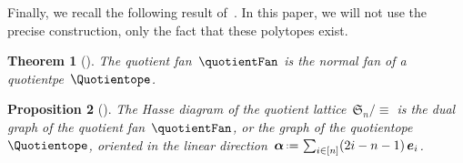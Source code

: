 \documentclass{amsart}
\newtheorem{theorem}{Theorem}[section]
\newtheorem{proposition}[theorem]{Proposition}
\theoremstyle{definition}
\newcommand{\f}[1]{{\mathfrak{#1}}} %
\renewcommand{\b}[1]{{\boldsymbol{#1}}} %
\newcommand{\eqdef}{\mbox{\,\raisebox{0.2ex}{\scriptsize\ensuremath{\mathrm:}}\ensuremath{=}\,}} %
\newcommand{\darkblue}{\color{darkblue}} %
\newcommand{\defn}[1]{\textsl{\darkblue #1}} %
\begin{document}

Finally, we recall the following result of~\cite{PilaudSantos-quotientopes, PadrolPilaudRitter}.
In this paper, we will not use the precise construction, only the fact that these polytopes exist.

\begin{theorem}[\cite{PilaudSantos-quotientopes, PadrolPilaudRitter}]
The quotient fan~$\quotientFan$ is the normal fan of a \defn{quotientpe}~$\Quotientope$.
\end{theorem}

\begin{proposition}[\cite{Reading-HopfAlgebras, PilaudSantos-quotientopes, PadrolPilaudRitter}]
The Hasse diagram of the quotient lattice~$\f{S}_n / {\equiv}$ is the dual graph of the quotient fan~$\quotientFan$, or the graph of the quotientope~$\Quotientope$, oriented in the linear direction~$\b{\alpha} \eqdef \sum_{i \in [n]} (2i-n-1) \, \b{e}_i$.
\end{proposition}
\end{document}
